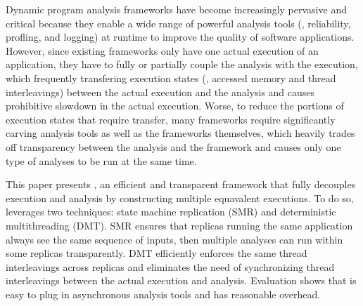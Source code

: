 
Dynamic program analysis frameworks have become increasingly pervasive and 
critical because they enable a wide range of powerful analysis tools (\eg, 
reliability, profling, and logging) at runtime to improve the quality of 
software applications. However, since existing frameworks only have one actual 
execution of an application, they have to fully or partially couple the 
analysis with the execution, which frequently transfering execution states 
(\eg, accessed memory and thread interleavings) between the actual execution 
and the analysis and causes prohibitive slowdown in the actual execution. 
Worse, to reduce the portions of execution states that require transfer, many 
frameworks require significantly carving analysis tools as well as the 
frameworks themselves, which heavily trades off transparency between the 
analysis and the framework and causes only one type of analyses to be run at 
the same time.


This paper presents \xxx, an efficient and transparent framework that fully 
decouples execution and analysis by constructing multiple equavalent 
executions. To do so, \xxx leverages two techniques: state machine replication 
(SMR) and deterministic multithreading (DMT). SMR ensures that replicas running 
the same application always see the same sequence of inputs, then multiple 
analyses can run within some replicas transparently. DMT efficiently enforces 
the same thread interleavings across replicas and eliminates the need of 
synchronizing thread interleavings between the actual execution and analysis. 
Evaluation shows that \xxx is easy to plug in asynchronous analysis tools and 
has reasonable overhead.